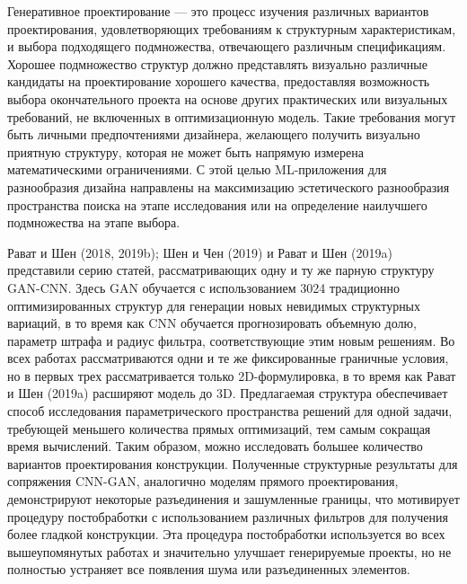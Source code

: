 Генеративное проектирование — это процесс изучения различных вариантов проектирования, удовлетворяющих требованиям к структурным характеристикам, и выбора подходящего подмножества, отвечающего различным спецификациям. Хорошее подмножество структур должно представлять визуально различные кандидаты на проектирование хорошего качества, предоставляя возможность выбора окончательного проекта на основе других практических или визуальных требований, не включенных в оптимизационную модель. Такие требования могут быть личными предпочтениями дизайнера, желающего получить визуально приятную структуру, которая не может быть напрямую измерена математическими ограничениями. С этой целью ML-приложения для разнообразия дизайна направлены на максимизацию эстетического разнообразия пространства поиска на этапе исследования или на определение наилучшего подмножества на этапе выбора.

Рават и Шен (2018, 2019b); Шен и Чен (2019) и Рават и Шен (2019a) представили серию статей, рассматривающих одну и ту же парную структуру GAN-CNN. Здесь GAN обучается с использованием 3024 традиционно оптимизированных структур для генерации новых невидимых структурных вариаций, в то время как CNN обучается прогнозировать объемную долю, параметр штрафа и радиус фильтра, соответствующие этим новым решениям. Во всех работах рассматриваются одни и те же фиксированные граничные условия, но в первых трех рассматривается только 2D-формулировка, в то время как Рават и Шен (2019a) расширяют модель до 3D. Предлагаемая структура обеспечивает способ исследования параметрического пространства решений для одной задачи, требующей меньшего количества прямых оптимизаций, тем самым сокращая время вычислений. Таким образом, можно исследовать большее количество вариантов проектирования конструкции. Полученные структурные результаты для сопряжения CNN-GAN, аналогично моделям прямого проектирования, демонстрируют некоторые разъединения и зашумленные границы, что мотивирует процедуру постобработки с использованием различных фильтров для получения более гладкой конструкции. Эта процедура постобработки используется во всех вышеупомянутых работах и значительно улучшает генерируемые проекты, но не полностью устраняет все появления шума или разъединенных элементов.

